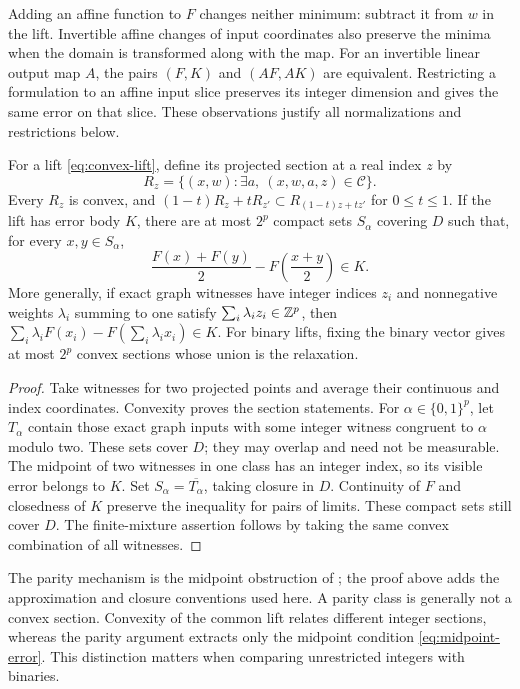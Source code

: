 Adding an affine function to $F$ changes neither minimum: subtract it
from $w$ in the lift. Invertible affine changes of input coordinates also
preserve the minima when the domain is transformed along with the map.
For an invertible linear output map $A$, the pairs $(F,K)$ and $(AF,AK)$
are equivalent. Restricting a formulation to an affine input slice
preserves its integer dimension and gives the same error on that slice.
These observations justify all normalizations and restrictions below.

\begin{lemma}\label{lem:parity}
For a lift \eqref{eq:convex-lift}, define its projected section at a
real index $z$ by
\[
 R_z=\{(x,w):\exists a,\ (x,w,a,z)\in\mathcal C\}.
\]
Every $R_z$ is convex, and
$(1-t)R_z+tR_{z'}\subset R_{(1-t)z+tz'}$ for $0\le t\le1$.
If the lift has error body $K$, there are at most $2^p$ compact sets
$S_\alpha$ covering $D$ such that, for every $x,y\in S_\alpha$,
\begin{equation}\label{eq:midpoint-error}
 \frac{F(x)+F(y)}2-F\left(\frac{x+y}2\right)\in K.
\end{equation}
More generally, if exact graph witnesses have integer indices $z_i$ and
nonnegative weights $\lambda_i$ summing to one satisfy
$\sum_i\lambda_i z_i\in\mathbb Z^p$, then
$\sum_i\lambda_iF(x_i)-F(\sum_i\lambda_i x_i)\in K$.
For binary lifts, fixing the binary vector gives at most $2^p$ convex
sections whose union is the relaxation.
\end{lemma}
\begin{proof}
Take witnesses for two projected points and average their continuous and
index coordinates. Convexity proves the section statements. For
$\alpha\in\{0,1\}^p$, let $T_\alpha$ contain those exact graph inputs
with some integer witness congruent to $\alpha$ modulo two. These sets
cover $D$; they may overlap and need not be measurable. The midpoint of
two witnesses in one class has an integer index, so its visible error
belongs to $K$. Set $S_\alpha=\overline{T_\alpha}$, taking closure in
$D$. Continuity of $F$ and closedness of $K$ preserve the inequality
for pairs of limits. These compact sets still cover $D$. The finite-mixture assertion follows
by taking the same convex combination of all witnesses.
\end{proof}

The parity mechanism is the midpoint obstruction of
\citet[Lemma 4.1]{lubin2022}; the proof above adds the approximation
and closure conventions used here. A parity class is generally not a
convex section. Convexity of the common lift relates different integer
sections, whereas the parity argument extracts only the midpoint
condition \eqref{eq:midpoint-error}. This distinction matters when
comparing unrestricted integers with binaries.

